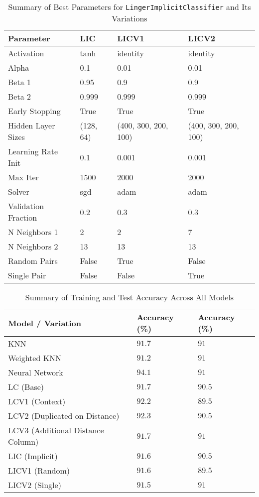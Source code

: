 \documentclass[a4paper, 12pt]{report}
\begin{document}
\begin{table}[H]
    \centering
    \caption{Summary of Best Parameters for \texttt{LingerImplicitClassifier} and Its Variations}
    \label{tab:best_parameters_LIC_variations_exp3}
    \begin{tabular}{|l|l|l|l|}
    \hline
    \textbf{Parameter} & \textbf{LIC} & \textbf{LICV1} & \textbf{LICV2} \\
    \hline
    Activation & tanh & identity & identity \\
    Alpha & 0.1 & 0.01 & 0.01 \\
    Beta 1 & 0.95 & 0.9 & 0.9 \\
    Beta 2 & 0.999 & 0.999 & 0.999 \\
    Early Stopping & True & True & True \\
    Hidden Layer Sizes & (128, 64) & (400, 300, 200, 100) & (400, 300, 200, 100) \\
    Learning Rate Init & 0.1 & 0.001 & 0.001 \\
    Max Iter & 1500 & 2000 & 2000 \\
    Solver & sgd & adam & adam \\
    Validation Fraction & 0.2 & 0.3 & 0.3 \\
    N Neighbors 1 & 2 & 2 & 7 \\
    N Neighbors 2 & 13 & 13 & 13 \\
    Random Pairs & False & True & False \\
    Single Pair & False & False & True \\
    \hline
    \end{tabular}
    \end{table}
\clearpage

\begin{table}[H]
    \centering
    \caption{Summary of Training and Test Accuracy Across All Models}
    \label{tab:summary_accuracy_all_models_exp3}
    \begin{tabular}{|l|l|l|}
    \toprule
    \textbf{Model / Variation} & \textbf{Accuracy (\%)} & \textbf{Accuracy (\%)} \\
    \midrule
    KNN & $91.7$ & $91$ \\
    Weighted KNN & $91.2$ & $91$ \\
    Neural Network & $94.1$ & $91$ \\
    LC (Base) & $91.7$ & $90.5$ \\
    LCV1 (Context) & $92.2$ & $89.5$ \\
    LCV2 (Duplicated on Distance) & $92.3$ & $90.5$ \\
    LCV3 (Additional Distance Column) & $91.7$ & $91$ \\
    LIC (Implicit) & $91.6$ & $90.5$ \\
    LICV1 (Random) & $91.6$ & $89.5$ \\
    LICV2 (Single) & $91.5$ & $91$ \\
    \bottomrule
    \end{tabular}
\end{table}
\end{document}
